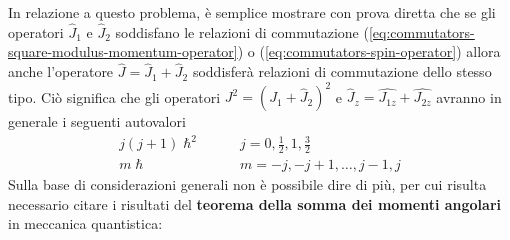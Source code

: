 In relazione a questo problema, è semplice mostrare con prova diretta
che se gli operatori \(\hat{J}_{1}\) e \(\hat{J}_{2}\) soddisfano le
relazioni di commutazione (\ref{eq:commutators-square-modulus-momentum-operator}) o (\ref{eq:commutators-spin-operator})
allora anche l'operatore
\(\hat{J} = \hat{J}_{1}+ \hat{J}_{2}\) soddisferà relazioni di
commutazione dello stesso tipo.
Ciò significa che gli operatori
\(J^{2} = (J_{1} + \hat{J}_{2})^{2}\) e
\(\hat{J}_{z} = \hat{J_{1z}} + \hat{J_{2z}}\) avranno in generale i
seguenti autovalori
\begin{align*}
    j(j+1) \hslash^{2} \qquad & j = 0, \frac{1}{2}, 1, \frac{3}{2}\\
    m \hslash  \qquad \quad & m = -j , -j +1, \dots , j-1, j
\end{align*} Sulla base di considerazioni generali non è possibile dire di più,
per cui risulta necessario citare i risultati del \textbf{teorema della somma
dei momenti angolari} in meccanica quantistica:
